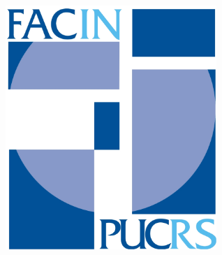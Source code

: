 \documentclass[a0,portrait]{a0poster}
\begin{document}
\hspace*{1cm}
\begin{minipage}[t]{0.15\linewidth}
	\vspace{-12cm}
	\hspace*{2cm}
	\includegraphics[width=8cm]{fig/logoFacin.pdf}
\end{minipage}
\vspace{2cm}

\end{document}
